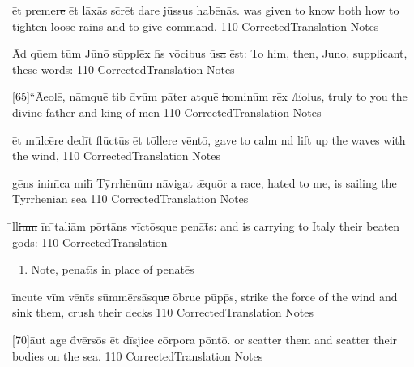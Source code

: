 \documentclass[]{book}
\begin{document}
\latline
  {\=et pr\-em\-er\sout{e }\=et l\=ax\={\macron a}s sc\={\macron {\i}}r\=et d\-ar\-e j\=uss\-us h\-ab\={\macron e}n\={\macron a}s.
}
  { was given to know both how to tighten loose rains and to give command. }
  {110}
  { CorrectedTranslation }
  { Notes }


\latline
  {\=Ad q\=uem t\=um J\={\macron u}n\={\macron o} s\=uppl\=ex h\={\macron {\i}}s v\={\macron o}c\-ib\-us \={\macron u}s\sout{a }\=est:
}
  { To him, then, Juno, supplicant, these words: }
  {110}
  { CorrectedTranslation }
  { Notes }

\newpage
\latline
  {[65]``\=A\-e\-ol\=e, n\=amqu\=e t\-ib\-{\macron {\i}} d\={\macron {\i}}v\=um p\=at\-er \-atqu\=e\sout{ h}\-om\-in\=um r\={\macron e}x
}
  { {\AE}olus, truly to you the divine father and king of men }
  {110}
  { CorrectedTranslation }
  { Notes }


\latline
  {\=et m\=ulc\={\macron e}r\-e d\-ed\=it fl\={\macron u}ct\={\macron u}s \=et t\=oll\-er\-e v\=ent\={\macron o},
}
  { gave to calm nd lift up the waves with the wind, }
  {110}
  { CorrectedTranslation }
  { Notes }


\latline
  {g\={\macron e}ns \-in\-im\={\macron {\i}}c\-a m\-ih\={\macron {\i}} T\=yrrh\={\macron e}n\=um n\={\macron a}v\-ig\-at \={\ae}qu\=or
}
  { a race, hated to me, is sailing the Tyrrhenian sea }
  {110}
  { CorrectedTranslation }
  { Notes }

\newpage

\latline
  {\={\macron {\i}}ll\sout{ium }\=in \={}t\-al\-i\=am p\=ort\={\macron a}ns v\=ict\={\macron o}squ\-e p\-en\={\macron a}t\={\macron {\i}}s:
}
  { and is carrying to Italy their beaten gods: }
  {110}
  { CorrectedTranslation }
  { \begin{enumerate}
  	\item Note, penat\={\i}s in place of penat\={e}s
  \end{enumerate} }


\latline
  {\=inc\-ut\-e v\=im v\=ent\={\macron {\i}}s s\=umm\=ers\={\macron a}squ\sout{e }\=obrue p\=upp\={\macron {\i}}s,
}
  { strike the force of the wind and sink them, crush their decks }
  {110}
  { CorrectedTranslation }
  { Notes }


\latline
  {[70]\={au}t \-ag\-e d\={\macron {\i}}v\=ers\={\macron o}s \=et d\=isj\-ic\-e c\=orp\-or\-a p\=ont\={\macron o}.
}
  { or scatter them and scatter their bodies on the sea. }
  {110}
  { CorrectedTranslation }
  { Notes }

\newpage
\end{document}
